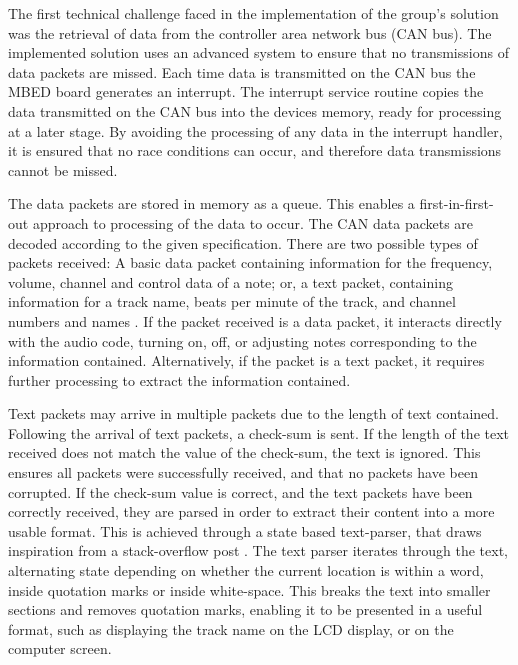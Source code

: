 The first technical challenge faced in the implementation of the group's solution
was the retrieval of data from the controller area network bus (CAN bus). The 
implemented solution uses an advanced system to ensure that no transmissions of 
data packets are missed. 
Each time data is transmitted on the CAN bus the MBED board generates an interrupt. 
The interrupt service routine copies the data transmitted on the CAN bus into 
the devices memory, ready for processing at a later stage. 
By avoiding the processing of any data in the interrupt handler, it is ensured 
that no race conditions can occur, and therefore data transmissions cannot be 
missed. 
\par\bigskip\noindent
The data packets are stored in memory as a queue. 
This enables a first-in-first-out approach to processing of the data to occur. 
The CAN data packets are decoded according to the given specification. 
There are two possible types of packets received: A basic data packet containing 
information for the frequency, volume, channel and control data of a note; or, 
a text packet, containing information for a track name, beats per minute of the 
track, and channel numbers and names \cite{data-packet}.
If the packet received is a data packet, it interacts directly with the audio 
code, turning on, off, or adjusting notes corresponding to the information 
contained. 
Alternatively, if the packet is a text packet, it requires further processing to 
extract the information contained. 
\par\bigskip\noindent
Text packets may arrive in multiple packets due to the length of text contained. 
Following the arrival of text packets, a check-sum is sent. 
If the length of the text received does not match the value of the check-sum, 
the text is ignored. 
This ensures all packets were successfully received, and that no packets have 
been corrupted. 
If the check-sum value is correct, and the text packets have been correctly 
received, they are parsed in order to extract their content into a more usable 
format. 
This is achieved through a state based text-parser, that draws inspiration from 
a stack-overflow post \cite{text-parser}. 
The text parser iterates through the text, alternating state depending on whether 
the current location is within a word, inside quotation marks or inside 
white-space. 
This breaks the text into smaller sections and removes quotation marks, 
enabling it to be presented in a useful format, such as displaying the track 
name on the LCD display, or on the computer screen. 

